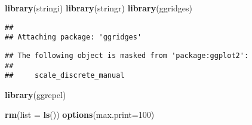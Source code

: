 \documentclass[]{article}
\newenvironment{Shaded}{\begin{snugshade}}{\end{snugshade}}
\newcommand{\CharTok}[1]{\textcolor[rgb]{0.31,0.60,0.02}{#1}}
\newcommand{\DataTypeTok}[1]{\textcolor[rgb]{0.13,0.29,0.53}{#1}}
\newcommand{\DecValTok}[1]{\textcolor[rgb]{0.00,0.00,0.81}{#1}}
\newcommand{\KeywordTok}[1]{\textcolor[rgb]{0.13,0.29,0.53}{\textbf{#1}}}
\newcommand{\NormalTok}[1]{#1}
\newcommand{\OperatorTok}[1]{\textcolor[rgb]{0.81,0.36,0.00}{\textbf{#1}}}
\newcommand{\StringTok}[1]{\textcolor[rgb]{0.31,0.60,0.02}{#1}}
\begin{document}
\begin{Shaded}
\begin{Highlighting}[]
\KeywordTok{library}\NormalTok{(stringi)}
\KeywordTok{library}\NormalTok{(stringr)}
\KeywordTok{library}\NormalTok{(ggridges)}
\end{Highlighting}
\end{Shaded}

\begin{verbatim}
## 
## Attaching package: 'ggridges'
\end{verbatim}

\begin{verbatim}
## The following object is masked from 'package:ggplot2':
## 
##     scale_discrete_manual
\end{verbatim}

\begin{Shaded}
\begin{Highlighting}[]
\KeywordTok{library}\NormalTok{(ggrepel)}
\end{Highlighting}
\end{Shaded}

\begin{Shaded}
\begin{Highlighting}[]
\KeywordTok{rm}\NormalTok{(}\DataTypeTok{list =} \KeywordTok{ls}\NormalTok{())}
\KeywordTok{options}\NormalTok{(}\DataTypeTok{max.print=}\DecValTok{100}\NormalTok{)}
\end{Highlighting}
\end{Shaded}

\begin{Shaded}
\end{Shaded}
\end{document}
